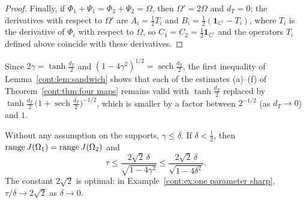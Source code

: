 \begin{proof}
Finally, if $\Phi_1+\Psi_1=\Phi_2+\Psi_2=\Omega$, then $\Omega'=2\Omega$ and $d_T=0$; the derivatives with respect to $\Omega'$ are $A_i=\frac12T_i$ and $B_i=\frac12(\mathbf{1}_{\mathbb{C}^r}-T_i)$, where $T_i$ is the derivative of $\Phi_i$ with respect to $\Omega$, so $C_1=C_2=\frac12\mathbf{1}_{\mathbb{C}^r}$ and the operators $T_i$ defined above coincide with these derivatives.
\end{proof}

Since $2\gamma=\tanh\frac{d_T}{2}$ and $(1-4\gamma^2)^{1/2}=\operatorname{sech}\frac{d_T}{2}$, the first inequality of Lemma~\ref{cont:lem:sandwich} shows that each of the estimates (a)--(f) of Theorem~\ref{cont:thm:four maps} remains valid with $\tanh\frac{d_T}{2}$ replaced by $\tanh\frac{d_T}{2}\,\big(1+\operatorname{sech}\frac{d_T}{2}\big)^{-1/2}$, which is smaller by a factor between $2^{-1/2}$ (as $d_T\to0$) and $1$.

\begin{lemma}\label{cont:lem:one parameter}
Without any assumption on the supports, $\gamma\leq\delta$. If $\delta<\frac12$, then $\operatorname{range} J(\Omega_1)=\operatorname{range} J(\Omega_2)$ and
\[
\tau\leq\frac{2\sqrt2\,\delta}{\sqrt{1-4\gamma^2}}\leq\frac{2\sqrt2\,\delta}{\sqrt{1-4\delta^2}} .
\]
The constant $2\sqrt2$ is optimal: in Example~\ref{cont:ex:one parameter sharp}, $\tau/\delta\to2\sqrt2$ as $\delta\to0$.
\end{lemma}

